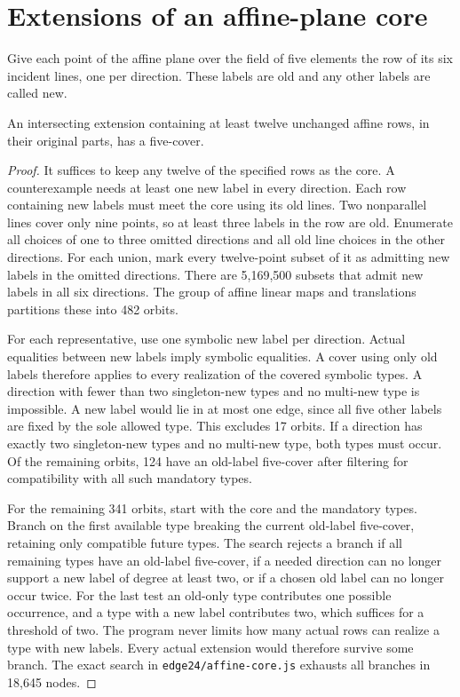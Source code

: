 \section{Extensions of an affine-plane core}

Give each point of the affine plane over the field of five elements
the row of its six incident lines, one per direction. These labels are old and any
other labels are called new.

\begin{proposition}
An intersecting extension containing at least twelve unchanged
affine rows, in their original parts, has a five-cover.
\end{proposition}

\begin{proof}
It suffices to keep any twelve of the specified rows as the core.
A counterexample needs at least one new label in every direction.
Each row containing new labels must meet the core using its old
lines. Two nonparallel lines cover only nine points, so at least
three labels in the row are old. Enumerate all choices of one to three
omitted directions and all old line choices in the other directions.
For each union, mark every twelve-point subset of it as admitting new
labels in the omitted directions. There are 5,169,500 subsets that
admit new labels in all six directions. The group of affine linear
maps and translations partitions these into 482 orbits.

For each representative, use one symbolic new label per direction.
Actual equalities between new labels imply symbolic equalities. A
cover using only old labels therefore applies to every realization
of the covered symbolic types. A direction with fewer than two
singleton-new types and no multi-new type is impossible. A new
label would lie in at most one edge, since all five other labels are
fixed by the sole allowed type. This excludes 17 orbits. If a
direction has exactly two singleton-new types and no multi-new type,
both types must occur. Of the remaining orbits, 124 have an old-label
five-cover after filtering for compatibility with all such mandatory
types.

For the remaining 341 orbits, start with the core and the mandatory
types. Branch on the first available type breaking the current
old-label five-cover, retaining only compatible future types. The
search rejects a branch if all remaining types have an old-label
five-cover, if a needed direction can no longer support a new label
of degree at least two, or if a chosen old label can no longer occur
twice. For the last test an old-only type contributes one possible
occurrence, and a type with a new label contributes two, which
suffices for a threshold of two. The program never limits how many
actual rows can realize a type with new labels. Every actual extension
would therefore survive some branch. The exact search in
\texttt{edge24/affine-core.js} exhausts all branches in 18,645 nodes.
\end{proof}

